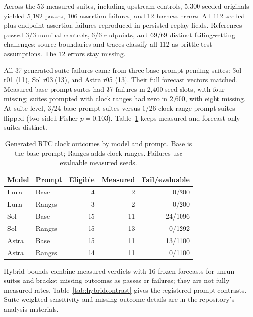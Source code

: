 \documentclass[sigconf,nonacm]{acmart}
\begin{document}
Across the 53 measured suites, including upstream controls, 5,300 seeded originals yielded 5,182 passes, 106 assertion failures, and 12 harness errors. All 112 seeded-plus-endpoint assertion failures reproduced in persisted replay fields. References passed 3/3 nominal controls, 6/6 endpoints, and 69/69 distinct failing-setting challenges; source boundaries and traces classify all 112 as brittle test assumptions. The 12 errors stay missing.

All 37 generated-suite failures came from three base-prompt pending suites: Sol r01 (11), Sol r03 (13), and Astra r05 (13). Their full forecast vectors matched. Measured base-prompt suites had 37 failures in 2,400 seed slots, with four missing; suites prompted with clock ranges had zero in 2,600, with eight missing. At suite level, 3/24 base-prompt suites versus 0/26 clock-range-prompt suites flipped (two-sided Fisher $p=0.103$). Table~\ref{tab:agent} keeps measured and forecast-only suites distinct.

\begin{table}[t]
\caption{Generated RTC clock outcomes by model and prompt. Base is the base prompt; Ranges adds clock ranges. Failures use evaluable measured seeds.}
\label{tab:agent}\scriptsize
\begin{tabular}{@{}llrrr@{}}\toprule
Model & Prompt & Eligible & Measured & Fail/evaluable \\ \midrule
Luna & Base & 4 & 2 & 0/200 \\
Luna & Ranges & 3 & 2 & 0/200 \\
Sol & Base & 15 & 11 & 24/1096 \\
Sol & Ranges & 15 & 13 & 0/1292 \\
Astra & Base & 15 & 11 & 13/1100 \\
Astra & Ranges & 14 & 11 & 0/1100 \\
\bottomrule\end{tabular}
\end{table}

Hybrid bounds combine measured verdicts with 16 frozen forecasts for unrun suites and bracket missing outcomes as passes or failures; they are not fully measured rates. Table~\ref{tab:hybridcontrast} gives the registered prompt contrasts. Suite-weighted sensitivity and missing-outcome details are in the repository's analysis materials.
\end{document}
